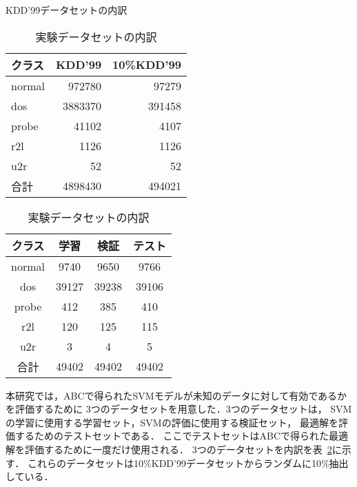 \begin{table}[tb]
    \centering
    \begin{minipage}{0.45\textwidth}  %
        \centering
        \caption{KDD'99データセットの内訳}  %
        \begin{tabular}{|l|r|r|}  %
          \hline  %
          クラス & KDD'99 & 10\%KDD'99 \\  %
          \hline  %
          normal & 972780 & 97279 \\  %
          \hline  %
          dos & 3883370 & 391458 \\  %
          \hline  %
          probe & 41102 & 4107 \\  %
          \hline  %
          r2l & 1126 & 1126 \\  %
          \hline  %
          u2r & 52 & 52 \\  %
          \hline  %
          合計 & 4898430 & 494021 \\  %
          \hline  %
        \end{tabular}
        \label{kdd99}  %
    \end{minipage}
    \begin{minipage}{0.45\textwidth}  %
        \centering
        \caption{実験データセットの内訳}  %
        \begin{tabular}{|c|c|c|c|}  %
          \hline  %
          クラス & 学習 & 検証 & テスト \\  %
          \hline  %
          normal & 9740 & 9650 & 9766 \\  %
          \hline  %
          dos & 39127 & 39238 & 39106 \\  %
          \hline  %
          probe & 412 & 385 & 410 \\  %
          \hline  %
          r2l & 120 & 125 & 115 \\  %
          \hline  %
          u2r & 3 & 4 & 5 \\  %
          \hline  %
          合計 & 49402 & 49402 & 49402 \\  %
          \hline  %
        \end{tabular}
        \label{3kdd99}  %
    \end{minipage}
  \end{table}
本研究では，ABCで得られたSVMモデルが未知のデータに対して有効であるかを評価するために
3つのデータセットを用意した\cite{origin}．3つのデータセットは，
SVMの学習に使用する学習セット，SVMの評価に使用する検証セット，
最適解を評価するためのテストセットである．
ここでテストセットはABCで得られた最適解を評価するために一度だけ使用される．
3つのデータセットを内訳を表~\ref{3kdd99}に示す．
これらのデータセットは10\%KDD'99データセットからランダムに10\%抽出している．
